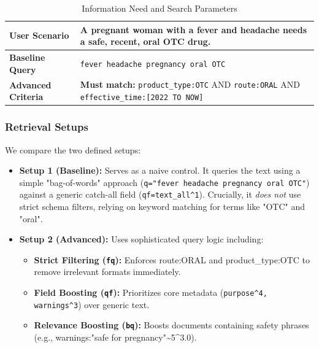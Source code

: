 \begin{table}[htbp]
    \centering
    \caption{Information Need and Search Parameters}
    \label{tab:infoneed}
    \begin{tabular}{p{3.0cm} p{4.5cm}}
        \hline
        \textbf{User Scenario}     & A pregnant woman with a fever and headache needs a safe, recent, oral OTC drug.                                                \\
        \hline
        \textbf{Baseline Query}    & \texttt{fever headache pregnancy oral OTC}                                                                                     \\
        \textbf{Advanced Criteria} & \textbf{Must match:} \texttt{product\_type:OTC} AND \texttt{route:\allowbreak ORAL} AND \texttt{effective\_time:[2022 TO NOW]} \\
        \hline
    \end{tabular}
\end{table}

\subsubsection{Retrieval Setups}
We compare the two defined setups:
\begin{itemize}
    \item \textbf{Setup 1 (Baseline):} Serves as a naive control. It queries the text using a simple "bag-of-words" approach (\texttt{q="fever headache pregnancy oral OTC"}) against a generic catch-all field (\texttt{qf=text\_all\^{}1}). Crucially, it \textit{does not} use strict schema filters, relying on keyword matching for terms like "OTC" and "oral".
    \item \textbf{Setup 2 (Advanced):} Uses sophisticated query logic including:
          \begin{itemize}
              \item \textbf{Strict Filtering (\texttt{fq}):} Enforces route:ORAL
                    and product\_type:OTC to remove irrelevant formats immediately.
              \item \textbf{Field Boosting (\texttt{qf}):} Prioritizes core metadata (\texttt{purpose\^{}4, warnings\^{}3}) over generic text.
              \item \textbf{Relevance Boosting (\texttt{bq}):} Boosts documents containing safety phrases (e.g., warnings:\allowbreak "safe for pregnancy"\~{}5\^{}3.0).
          \end{itemize}
\end{itemize}

